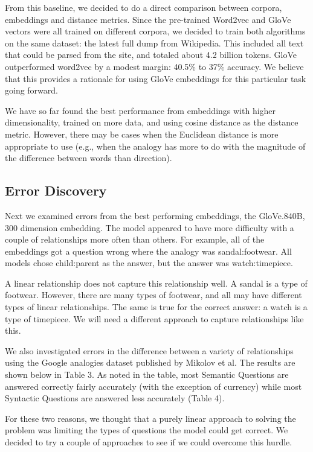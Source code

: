 \documentclass[11pt]{article}
\begin{document}
From this baseline, we decided to do a direct comparison between corpora,
embeddings and distance metrics. Since the pre-trained Word2vec and GloVe
vectors were all trained on different corpora, we decided to train both
algorithms on the same dataset: the latest full dump from Wikipedia. This
included all text that could be parsed from the site, and totaled about 4.2
billion tokens. GloVe outperformed word2vec by a modest margin: 40.5\% to 37\%
accuracy. We believe that this provides a rationale for using GloVe embeddings
for this particular task going forward.

We have so far found the best performance from embeddings with higher
dimensionality, trained on more data, and using cosine distance as the
distance metric. However, there may be cases when the Euclidean distance
is more appropriate to use (e.g., when the analogy has more to do with
the magnitude of the difference between words than direction).

\subsection{Error Discovery}

Next we examined errors from the best performing embeddings, the GloVe.840B, 300
dimension embedding. The model appeared to have more difficulty with a couple of
relationships more often than others. For example, all of the embeddings got a
question wrong where the analogy was sandal:footwear. All models chose
child:parent as the answer, but the answer was watch:timepiece.

A linear relationship does not capture this relationship well. A sandal
is a type of footwear. However, there are many types of footwear, and
all may have different types of linear relationships. The same is true
for the correct answer: a watch is a type of timepiece. We will need a
different approach to capture relationships like this.

We also investigated errors in the difference between a variety of
relationships using the Google analogies dataset published by Mikolov et
al. The results are shown below in Table 3. As noted in the table, most
Semantic Questions are answered correctly fairly accurately (with the
exception of currency) while most Syntactic Questions are answered less
accurately (Table 4).

For these two reasons, we thought that a purely linear approach to
solving the problem was limiting the types of questions the model could
get correct. We decided to try a couple of approaches to see if we could
overcome this hurdle.
\end{document}
